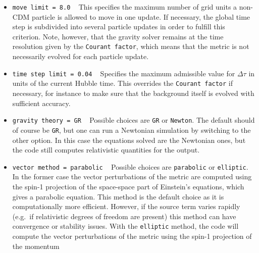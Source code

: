 \documentclass[a4paper,10pt]{article}
\begin{document}
\begin{itemize}
 (conformal) time step, the \texttt{Courant factor} is given by $\mathsf{\Delta\tau} / \mathsf{\Delta}$\textit{x}. In other words, it is the
 number of grid units which a light signal can travel during one time step. Note that CDM and baryon particles (as opposed to non-CDM
 species) do not have a separate Courant criterion at present. However, if the \texttt{Courant factor} remains $\lesssim$ 100, the CDM
 particles will typically not move by more than one grid unit each time step (as their velocity is typically no more than 1\% of the speed
 of light).
 \item[] \hspace{-25pt}\texttt{move limit = 8.0} ~ This specifies the maximum number of grid units a non-CDM particle is allowed to move in
 one update. If necessary, the global time step is subdivided into several particle updates in order to fulfill this criterion. Note,
 however, that the gravity solver remains at the time resolution given by the \texttt{Courant factor}, which means that the metric is not
 necessarily evolved for each particle update.
 \item[] \hspace{-25pt}\texttt{time step limit = 0.04} ~ Specifies the maximum admissible value for $\mathsf{\Delta\tau}$ in units of the
 current Hubble time. This overrides the \texttt{Courant factor} if necessary, for instance to make sure that the background itself is
 evolved with sufficient accuracy.
 \item[] \hspace{-25pt}\texttt{gravity theory = GR} ~ Possible choices are \texttt{GR} or \texttt{Newton}. The default should of course be
 \texttt{GR}, but one can run a Newtonian simulation by switching to the other option. In this case the equations solved are the Newtonian
 ones, but the code still computes relativistic quantities for the output.
 \item[] \hspace{-25pt}\texttt{vector method = parabolic} ~ Possible choices are \texttt{parabolic} or \texttt{elliptic}. In the former case
 the vector perturbations of the metric are computed using the spin-1 projection of the space-space part of Einstein's equations, which
 gives a parabolic equation. This method is the default choice as it is computationally more efficient. However, if the source term varies
 rapidly (e.g.\ if relativistic degrees of freedom are present) this method can have convergence or stability issues. With the
 \texttt{elliptic} method, the code will compute the vector perturbations of the metric using the spin-1 projection of the momentum

\end{itemize}
\end{document}
